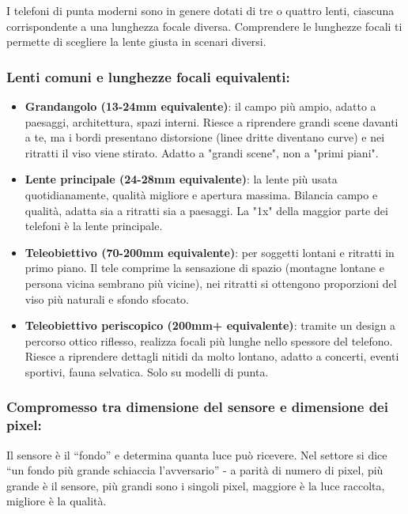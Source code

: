 
I telefoni di punta moderni sono in genere dotati di tre o quattro lenti, ciascuna corrispondente a una lunghezza focale diversa. Comprendere le lunghezze focali ti permette di scegliere la lente giusta in scenari diversi.

\subsubsection*{Lenti comuni e lunghezze focali equivalenti:}

\begin{itemize}
  \item \textbf{Grandangolo (13-24mm equivalente)}: il campo più ampio, adatto a paesaggi, architettura, spazi interni. Riesce a riprendere grandi scene davanti a te, ma i bordi presentano distorsione (linee dritte diventano curve) e nei ritratti il viso viene stirato. Adatto a "grandi scene", non a "primi piani".
  \item \textbf{Lente principale (24-28mm equivalente)}: la lente più usata quotidianamente, qualità migliore e apertura massima. Bilancia campo e qualità, adatta sia a ritratti sia a paesaggi. La "1x" della maggior parte dei telefoni è la lente principale.
  \item \textbf{Teleobiettivo (70-200mm equivalente)}: per soggetti lontani e ritratti in primo piano. Il tele comprime la sensazione di spazio (montagne lontane e persona vicina sembrano più vicine), nei ritratti si ottengono proporzioni del viso più naturali e sfondo sfocato.
  \item \textbf{Teleobiettivo periscopico (200mm+ equivalente)}: tramite un design a percorso ottico riflesso, realizza focali più lunghe nello spessore del telefono. Riesce a riprendere dettagli nitidi da molto lontano, adatto a concerti, eventi sportivi, fauna selvatica. Solo su modelli di punta.
\end{itemize}

\subsubsection*{Compromesso tra dimensione del sensore e dimensione dei pixel:}

Il sensore è il “fondo” e determina quanta luce può ricevere. Nel settore si dice “un fondo più grande schiaccia l'avversario” - a parità di numero di pixel, più grande è il sensore, più grandi sono i singoli pixel, maggiore è la luce raccolta, migliore è la qualità.

